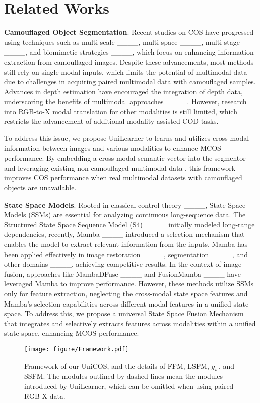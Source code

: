 \section{Related Works}
\noindent \textbf{Camouflaged Object Segmentation}. Recent studies on COS have progressed using techniques such as multi-scale ____, multi-space ____, multi-stage ____, and biomimetic strategies ____, which focus on enhancing information extraction from camouflaged images. Despite these advancements, most methods still rely on single-modal inputs, which limits the potential of multimodal data due to challenges in acquiring paired multimodal data with camouflaged samples. Advances in depth estimation have encouraged the integration of depth data, underscoring the benefits of multimodal approaches ____. However, research into RGB-to-X modal translation for other modalities is still limited, which restricts the advancement of additional modality-assisted COD tasks.

To address this issue, we propose UniLearner to learns and utilizes cross-modal information between images and various modalities to enhance MCOS performance. By embedding a cross-modal semantic vector into the segmentor and leveraging existing non-camouflaged multimodal data%
, this framework improves COS performance when real multimodal datasets with camouflaged objects are unavailable.

\noindent \textbf{State Space Models}. Rooted in classical control theory ____, State Space Models (SSMs) are essential for analyzing continuous long-sequence data. The Structured State Space Sequence Model (S4) ____ initially modeled long-range dependencies, recently, Mamba ____ introduced a selection mechanism  that enables the model to extract relevant information from the inputs. Mamba has been applied effectively in image restoration ____, segmentation ____, and other domains ____, achieving competitive results. 
In the context of image fusion, approaches like MambaDFuse ____ and FusionMamba ____ have leveraged Mamba to improve performance. However, these methods utilize SSMs only for feature extraction, neglecting the cross-modal state space features and Mamba’s selection capabilities across different modal features in a unified state space.
To address this, we propose a universal State Space Fusion Mechanism that integrates and selectively extracts features across modalities within a unified state space, enhancing MCOS performance.

\begin{figure*}[h]
\setlength{\abovecaptionskip}{0cm}
	\centering
	\texttt{[image: figure/Framework.pdf]}\vspace{-4mm}
	\caption{Framework of our UniCOS, and the details of FFM, LSFM, \(g_w\), and SSFM. The modules outlined by dashed lines mean the modules introduced by UniLearner, which can be omitted when using paired RGB-X data.
    }
	\label{fig:Framework}
	\vspace{-5mm}
\end{figure*}